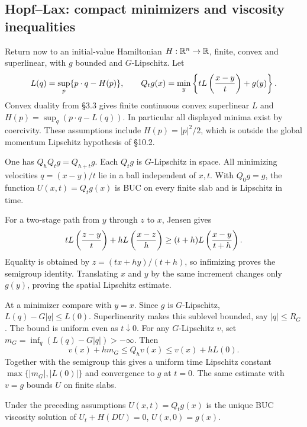 \subsection{Hopf--Lax: compact minimizers and viscosity inequalities}
Return now to an initial-value Hamiltonian $H:\mathbb{R}^n\to\mathbb{R}$, finite,
convex and superlinear, with $g$ bounded and $G$-Lipschitz. Let
\[
 L(q)=\sup_p\{p\cdot q-H(p)\},\qquad
 Q_tg(x)=\min_y\left\{tL\left({x-y\over t}\right)+g(y)\right\}.
\]
Convex duality from \S3.3 gives finite continuous convex superlinear $L$
and $H(p)=\sup_q(p\cdot q-L(q))$. In particular all displayed minima
exist by coercivity. These assumptions include $H(p)=|p|^2/2$, which
is outside the global momentum Lipschitz hypothesis of \S10.2.
\Needspace{55mm}
\begin{lemma}
One has $Q_hQ_tg=Q_{h+t}g$. Each $Q_tg$ is $G$-Lipschitz in space.
All minimizing velocities $q=(x-y)/t$ lie in a ball independent of $x,t$.
With $Q_0g=g$, the function $U(x,t)=Q_tg(x)$ is BUC on every finite slab
and is Lipschitz in time.
\end{lemma}
\begin{expandedproof}
For a two-stage path from $y$ through $z$ to $x$, Jensen gives
\[
 tL\left({z-y\over t}\right)+hL\left({x-z\over h}\right)
 \geq(t+h)L\left({x-y\over t+h}\right).
\]
Equality is obtained by $z=(tx+hy)/(t+h)$, so infimizing proves the
semigroup identity. Translating $x$ and $y$ by the same increment
changes only $g(y)$, proving the spatial Lipschitz estimate.

At a minimizer compare with $y=x$. Since $g$ is $G$-Lipschitz,
$L(q)-G|q|\leq L(0)$. Superlinearity makes this sublevel bounded,
say $|q|\leq R_G$. The bound is uniform even as $t\downarrow0$.
For any $G$-Lipschitz $v$, set
$m_G=\inf_q(L(q)-G|q|)>-\infty$. Then
\[
 v(x)+hm_G\leq Q_hv(x)\leq v(x)+hL(0).
\]
Together with the semigroup this gives a uniform time Lipschitz constant
$\max\{|m_G|,|L(0)|\}$ and convergence to $g$ at $t=0$.
The same estimate with $v=g$ bounds $U$ on finite slabs.
\end{expandedproof}
\Needspace{55mm}
\begin{theorem}
Under the preceding assumptions $U(x,t)=Q_tg(x)$ is the unique BUC
viscosity solution of $U_t+H(DU)=0$, $U(x,0)=g(x)$.
\end{theorem}
